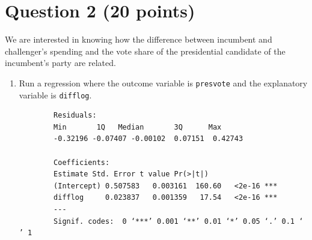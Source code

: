 \documentclass[12pt,letterpaper]{article}
\begin{document}
\section*{Question 2 (20 points)}
\noindent We are interested in knowing how the difference between incumbent and challenger's spending and the vote share of the presidential candidate of the incumbent's party are related.	\vspace{.25cm}
	\begin{enumerate}
		\item Run a regression where the outcome variable is \texttt{presvote} and the explanatory variable is \texttt{difflog}.	
		
			\begin{verbatim}
		Residuals:
		Min       1Q   Median       3Q      Max 
		-0.32196 -0.07407 -0.00102  0.07151  0.42743 
		
		Coefficients:
		Estimate Std. Error t value Pr(>|t|)    
		(Intercept) 0.507583   0.003161  160.60   <2e-16 ***
		difflog     0.023837   0.001359   17.54   <2e-16 ***
		---
		Signif. codes:  0 ‘***’ 0.001 ‘**’ 0.01 ‘*’ 0.05 ‘.’ 0.1 ‘ ’ 1
		

\end{verbatim}
\end{enumerate}
\end{document}
